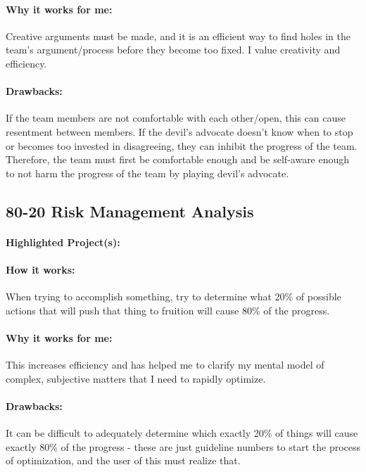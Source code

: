 \documentclass[a4paper,12pt]{article}
\begin{document}
\paragraph{Why it works for me: }
Creative arguments must be made, and it is an efficient way to find holes in the team’s argument/process before they become too fixed. I value creativity and efficiency.

\paragraph{Drawbacks: }
If the team members are not comfortable with each other/open, this can cause resentment between members. If the devil’s advocate doesn’t know when to stop or becomes too invested in disagreeing, they can inhibit the progress of the team. Therefore, the team must first be comfortable enough and be self-aware enough to not harm the progress of the team by playing devil’s advocate.

\subsection{80-20 Risk Management Analysis}
\paragraph{Highlighted Project(s): }

\paragraph{How it works: }
When trying to accomplish something, try to determine what 20\% of possible actions that will push that thing to fruition will cause 80\% of the progress.

\paragraph{Why it works for me: }
This increases efficiency and has helped me to clarify my mental model of complex, subjective matters that I need to rapidly optimize.

\paragraph{Drawbacks: }
It can be difficult to adequately determine which exactly 20\% of things will cause exactly 80\% of the progress - these are just guideline numbers to start the process of optimization, and the user of this must realize that.
\end{document}
